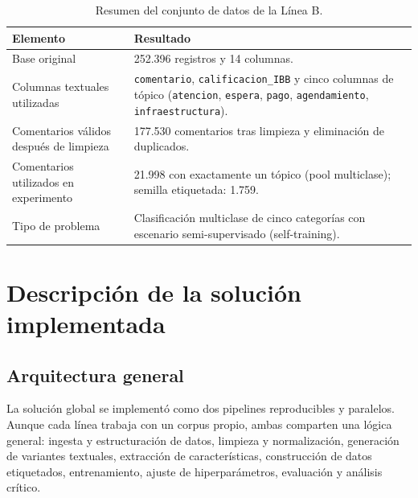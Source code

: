 \documentclass[12pt,a4paper]{article}
\newcommand{\code}[1]{\nolinkurl{#1}}
\begin{document}
\begin{table}[htbp]
\centering
\caption{Resumen del conjunto de datos de la Línea B.}
\label{tab:dataset_b_resumen}
\small
\begin{tabularx}{\textwidth}{@{}P{5.4cm}Y@{}}
\toprule
\textbf{Elemento} & \textbf{Resultado} \\
\midrule
Base original & 252.396 registros y 14 columnas. \\
Columnas textuales utilizadas & \code{comentario}, \code{calificacion\_IBB} y cinco columnas de tópico (\code{atencion}, \code{espera}, \code{pago}, \code{agendamiento}, \code{infraestructura}). \\
Comentarios válidos después de limpieza & 177.530 comentarios tras limpieza y eliminación de duplicados. \\
Comentarios utilizados en experimento & 21.998 con exactamente un tópico (pool multiclase); semilla etiquetada: 1.759. \\
Tipo de problema & Clasificación multiclase de cinco categorías con escenario semi-supervisado (self-training). \\
\bottomrule
\end{tabularx}
\end{table}
\FloatBarrier

\section{Descripción de la solución implementada}

\subsection{Arquitectura general}

La solución global se implementó como dos pipelines reproducibles y paralelos. Aunque cada línea trabaja con un corpus propio, ambas comparten una lógica general: ingesta y estructuración de datos, limpieza y normalización, generación de variantes textuales, extracción de características, construcción de datos etiquetados, entrenamiento, ajuste de hiperparámetros, evaluación y análisis crítico.

\begin{center}
\end{center}
\end{document}
